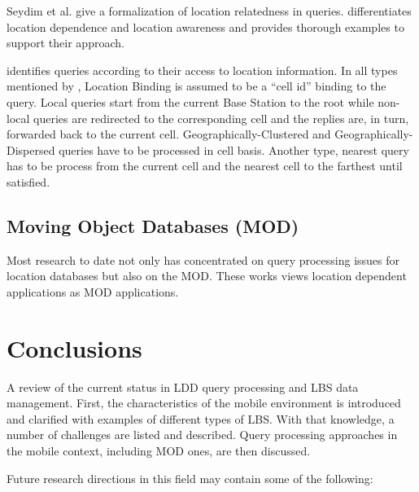 \documentclass[12pt,a4paper]{article}
\begin{document}
Seydim et al. give a formalization of location relatedness in queries. \cite{Seydim:2001wk} differentiates location dependence and location awareness and provides thorough examples to support their approach.

\cite{xu2000querying} identifies queries according to their access to location information. In all types mentioned by \cite{xu2000querying}, Location Binding is assumed to be a ``cell id'' binding to the query. Local queries start from the current Base Station to the root while non-local queries are redirected to the corresponding cell and the replies are, in turn, forwarded back to the current cell. Geographically-Clustered and Geographically-Dispersed queries have to be processed in cell basis. Another type, nearest query has to be process from the current cell and the nearest cell to the farthest until satisfied.

\subsection{Moving Object Databases (MOD)} %
\label{sub:moving_object_databases}
Most research to date not only has concentrated on query processing issues for location databases but also on the MOD. \cite{prasad1997modeling, wolfson1998moving} These works views location dependent applications as MOD applications.


\section{Conclusions} %
\label{sec:conclusions}
A review of the current status in LDD query processing and LBS data management. First, the characteristics of the mobile environment is introduced and clarified with examples of different types of LBS. With that knowledge, a number of challenges are listed and described. Query processing approaches in the mobile context, including MOD ones, are then discussed.

Future research directions in this field may contain some of the following:
\end{document}
